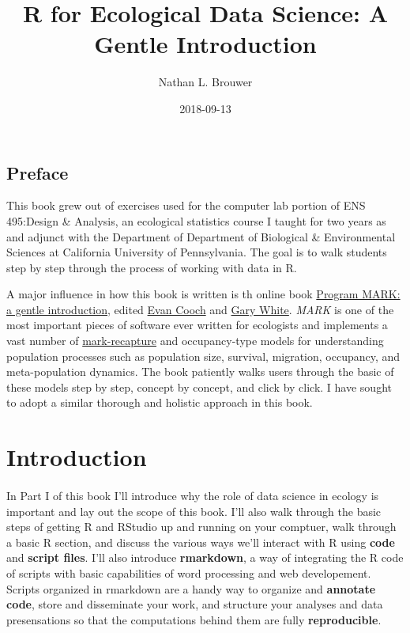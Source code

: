 \documentclass[]{book}
\title{R for Ecological Data Science: A Gentle Introduction}
\author{Nathan L. Brouwer}
\date{2018-09-13}
\theoremstyle{definition}
\theoremstyle{definition}
\theoremstyle{definition}
\theoremstyle{remark}
\begin{document}
\maketitle

{
\setcounter{tocdepth}{1}
\tableofcontents
}
\chapter*{Preface}\label{preface}

This book grew out of exercises used for the computer lab portion of ENS
495:Design \& Analysis, an ecological statistics course I taught for two
years as and adjunct with the Department of Department of Biological \&
Environmental Sciences at California University of Pennsylvania. The
goal is to walk students step by step through the process of working
with data in R.

A major influence in how this book is written is th online book
\href{http://www.phidot.org/software/mark/docs/book/}{Program MARK: a
gentle introduction}, edited \href{http://canuck.dnr.cornell.edu/}{Evan
Cooch} and \href{https://sites.warnercnr.colostate.edu/gwhite/}{Gary
White}. \emph{MARK} is one of the most important pieces of software ever
written for ecologists and implements a vast number of
\href{https://en.wikipedia.org/wiki/Mark_and_recapture}{mark-recapture}
and occupancy-type models for understanding population processes such as
population size, survival, migration, occupancy, and meta-population
dynamics. The book patiently walks users through the basic of these
models step by step, concept by concept, and click by click. I have
sought to adopt a similar thorough and holistic approach in this book.

\part{Introduction}\label{part-introduction}

\subsection*{}\label{section}

In Part I of this book I'll introduce why the role of data science in
ecology is important and lay out the scope of this book. I'll also walk
through the basic steps of getting R and RStudio up and running on your
comptuer, walk through a basic R section, and discuss the various ways
we'll interact with R using \textbf{code} and \textbf{script files}.
I'll also introduce \textbf{rmarkdown}, a way of integrating the R code
of scripts with basic capabilities of word processing and web
developement. Scripts organized in rmarkdown are a handy way to organize
and \textbf{annotate code}, store and disseminate your work, and
structure your analyses and data presensations so that the computations
behind them are fully \textbf{reproducible}.
\end{document}

